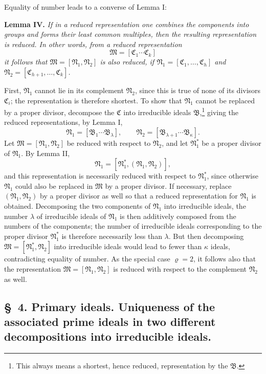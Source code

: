 \documentclass[11pt]{article}
\newcommand{\ideal}[1]{\mathfrak{#1}}
\begin{document}
Equality of number leads to a converse of Lemma I:

\textbf{Lemma IV.} \emph{If in a reduced representation one combines the components into groups and forms their least common multiples, then the resulting representation is reduced. In other words, from a reduced representation}
\[
 \ideal M=[\ideal C_1\cdots\ideal C_k]
\]
\emph{it follows that $\ideal M=[\ideal N_1,\ideal N_2]$ is also reduced, if $\ideal N_1=[\ideal C_1,\ldots,\ideal C_h]$ and $\ideal N_2=[\ideal C_{h+1},\ldots,\ideal C_k]$.}

First, $\ideal N_1$ cannot lie in its complement $\ideal N_2$, since this is true of none of its divisors $\ideal C_i$; the representation is therefore shortest. To show that $\ideal N_1$ cannot be replaced by a proper divisor, decompose the $\ideal C$ into irreducible ideals $\ideal B$,\footnote{This always means a shortest, hence reduced, representation by the $\ideal B$.} giving the reduced representations, by Lemma I,
\[
 \ideal N_1=[\ideal B_1\cdots\ideal B_\lambda],
 \qquad
 \ideal N_2=[\ideal B_{\lambda+1}\cdots\ideal B_\kappa].
\]
Let $\ideal M=[\ideal N_1,\ideal N_2]$ be reduced with respect to $\ideal N_2$, and let $\ideal N_1^*$ be a proper divisor of $\ideal N_1$. By Lemma II,
\[
 \ideal N_1=[\ideal N_1^*,(\ideal N_1,\ideal N_2)],
\]
and this representation is necessarily reduced with respect to $\ideal N_1^*$, since otherwise $\ideal N_1$ could also be replaced in $\ideal M$ by a proper divisor. If necessary, replace $(\ideal N_1,\ideal N_2)$ by a proper divisor as well so that a reduced representation for $\ideal N_1$ is obtained. Decomposing the two components of $\ideal N_1$ into irreducible ideals, the number $\lambda$ of irreducible ideals of $\ideal N_1$ is then additively composed from the numbers of the components; the number of irreducible ideals corresponding to the proper divisor $\ideal N_1^*$ is therefore necessarily less than $\lambda$. But then decomposing $\ideal M=[\ideal N_1^*,\ideal N_2]$ into irreducible ideals would lead to fewer than $\kappa$ ideals, contradicting equality of number. As the special case $\varrho=2$, it follows also that the representation $\ideal M=[\ideal N_1,\ideal N_2]$ is reduced with respect to the complement $\ideal N_2$ as well.

\subsection*{\S~4. Primary ideals. Uniqueness of the associated prime ideals in two different decompositions into irreducible ideals.}
\end{document}
